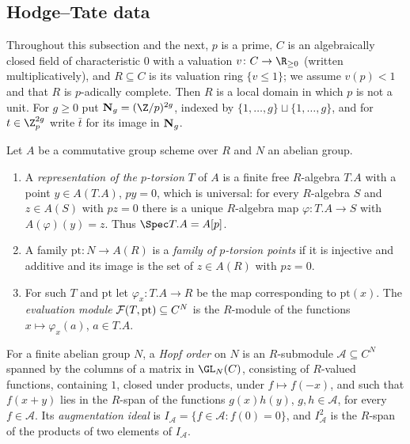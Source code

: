 \subsection{Hodge--Tate data}\label{pf:tower:sec-htd}

Throughout this subsection and the next, $p$ is a prime, $C$ is an algebraically closed field of
characteristic $0$ with a valuation $v\colon C\to\R_{\ge0}$ (written multiplicatively), and $R\subseteq C$
is its valuation ring $\{v\le1\}$; we assume $v(p)<1$ and that $R$ is $p$-adically complete. Then $R$ is
a local domain in which $p$ is not a unit. For $g\ge0$ put $\towerNb_g=(\Z/p)^{2g}$, indexed by
$\{1,\dots,g\}\sqcup\{1,\dots,g\}$, and for $t\in\Z_p^{2g}$ write $\bar t$ for its image in $\mathbf N_g$.

\begin{definition}\label{pf:tower:def-tors}
Let $A$ be a commutative group scheme over $R$ and $N$ an abelian group.
\begin{enumerate}[label=(\alph*)]
\item A \emph{representation of the $p$-torsion} $T$ of $A$ is a finite free $R$-algebra $T.A$ with a point
  $y\in A(T.A)$, $py=0$, which is universal: for every $R$-algebra $S$ and $z\in A(S)$ with $pz=0$ there is a
  unique $R$-algebra map $\varphi\colon T.A\to S$ with $A(\varphi)(y)=z$. Thus $\Spec T.A=A[p]$.
\item A family $\mathrm{pt}\colon N\to A(R)$ is a \emph{family of $p$-torsion points} if it is injective and
  additive and its image is the set of $z\in A(R)$ with $pz=0$.
\item For such $T$ and $\mathrm{pt}$ let $\varphi_x\colon T.A\to R$ be the map corresponding to $\mathrm{pt}(x)$.
  The \emph{evaluation module} $\mathcal F(T,\mathrm{pt})\subseteq C^N$ is the $R$-module of the functions
  $x\mapsto\varphi_x(a)$, $a\in T.A$.
\end{enumerate}
\end{definition}

\begin{definition}\label{pf:tower:def-hopf}
For a finite abelian group $N$, a \emph{Hopf order} on $N$ is an $R$-submodule $\mathcal A\subseteq C^N$ spanned by the
columns of a matrix in $\GL_N(C)$, consisting of $R$-valued functions, containing $1$, closed under products, under
$f\mapsto f(-x)$, and such that $f(x+y)$ lies in the $R$-span of the functions $g(x)h(y)$, $g,h\in\mathcal A$, for every
$f\in\mathcal A$. Its \emph{augmentation ideal} is $I_{\mathcal A}=\{f\in\mathcal A:f(0)=0\}$, and $I_{\mathcal A}^2$ is
the $R$-span of the products of two elements of $I_{\mathcal A}$.
\end{definition}

